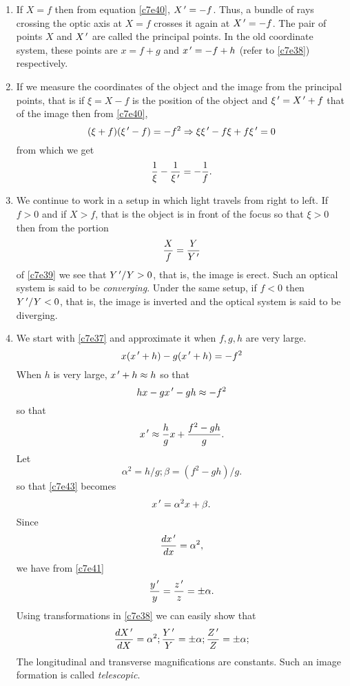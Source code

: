 \begin{enumerate}
\item If $X = f$ then from equation \eqref{c7e40}, $X^{\,\prime} = -f$. Thus, a bundle
of rays crossing the optic axis at $X = f$ crosses it again at $X^{\,\prime} = -f$.
The pair of points $X$ and $X^{\,\prime}$ are called the principal points. In the
old coordinate system, these points are $x = f + g$ and $x^{\,\prime} = -f + h$ (refer
to \eqref{c7e38}) respectively.

\item If we measure the coordinates of the object and the image from the
principal points, that is if $\xi = X - f$ is the position of the object and
$\xi^{\,\prime} = X^{\,\prime} + f$ that of the image then from \eqref{c7e40},
\[
(\xi + f)(\xi^{\,\prime} - f) = -f^2 \Rightarrow \xi\xi^{\,\prime} - f\xi + f\xi^{\,\prime} = 0
\]
from which we get
\begin{equation}\label{c7e42}
\frac{1}{\xi} - \frac{1}{\xi^{\,\prime}} = -\frac{1}{f}.
\end{equation}

\item We continue to work in a setup in which light travels from right to left.
If $f > 0$ and if $X > f$, that is the object is in front of the focus so that
$\xi > 0$ then from the portion
\[
\frac{X}{f} = \frac{Y}{Y^{\,\prime}}
\]
of \eqref{c7e39} we see that $Y^{\,\prime}/Y > 0$, that is, the image is erect. Such
an optical system is said to be \emph{converging}. Under the same setup, if
$f < 0$ then $Y^{\,\prime}/Y < 0$, that is, the image is inverted and the optical 
system is said to be diverging.

\item We start with \eqref{c7e37} and approximate it when $f, g, h$ are very 
large.
\[
x(x^{\,\prime} +h) - g(x^{\,\prime} + h) = -f^2
\]
When $h$ is very large, $x^{\,\prime} + h \approx h$ so that
\[
hx - gx^{\,\prime} - gh \approx -f^2
\]
so that
\begin{equation}\label{c7e43}
x^{\,\prime} \approx \frac{h}{g}x + \frac{f^2 - gh}{g}.
\end{equation}
Let
\begin{equation}\label{c7e44}
\alpha^2 = h/g; \beta = (f^2 - gh)/g.
\end{equation}
so that \eqref{c7e43} becomes
\begin{equation}\label{c7e45}
x^{\,\prime} = \alpha^2x + \beta.
\end{equation}
Since
\[
\frac{d{x^{\,\prime}}}{d{x}} = \alpha^2,
\]
we have from \eqref{c7e41}
\[
\frac{y^{\,\prime}}{y} = \frac{z^{\,\prime}}{z} = \pm\alpha.
\]
Using transformations in \eqref{c7e38} we can easily show that
\begin{equation}\label{c7e46}
\frac{d{X^{\,\prime}}}{d{X}} = \alpha^2; \frac{Y^{\,\prime}}{Y}=\pm\alpha;\frac{Z^{\,\prime}}{Z}=\pm\alpha;
\end{equation}
The longitudinal and transverse magnifications are constants. Such an image
formation is called \emph{telescopic}.
\end{enumerate}
